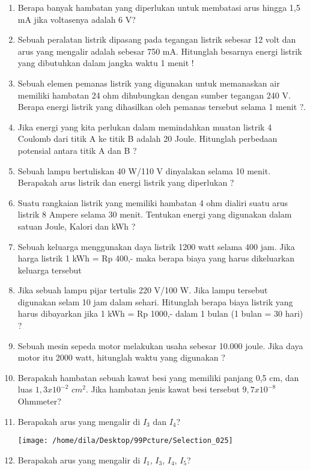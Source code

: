 \documentclass[12pt,a4paper,draft,final,oneside,twoside,openright,openany]{article}
\begin{document}
	\begin{enumerate}
	\item Berapa banyak hambatan yang diperlukan untuk membatasi arus hingga 1,5 mA jika voltasenya adalah 6 V?
	\item Sebuah peralatan listrik dipasang pada tegangan listrik sebesar 12 volt dan arus yang mengalir adalah sebesar 750 mA. Hitunglah besarnya energi listrik yang dibutuhkan dalam jangka waktu 1 menit !
	\item Sebuah elemen pemanas listrik yang digunakan untuk memanaskan air memiliki hambatan 24 ohm dihubungkan dengan sumber tegangan 240 V. Berapa energi listrik yang dihasilkan oleh pemanas tersebut selama 1 menit ?. 
	\item Jika energi yang kita perlukan dalam memindahkan muatan listrik 4 Coulomb dari titik A ke titik B adalah 20 Joule. Hitunglah perbedaan potensial antara titik A dan B ? 
	\item Sebuah lampu bertuliskan 40 W/110 V dinyalakan selama 10 menit. Berapakah arus listrik dan energi listrik yang diperlukan ?
	\item Suatu rangkaian listrik yang memiliki hambatan 4 ohm dialiri suatu arus listrik 8 Ampere selama 30 menit. Tentukan energi yang digunakan dalam satuan Joule, Kalori dan kWh ? 
	\item Sebuah keluarga menggunakan daya listrik 1200 watt selama 400 jam. Jika harga listrik 1 kWh = Rp 400,- maka berapa biaya yang harus dikeluarkan keluarga tersebut 
	\item Jika sebuah lampu pijar tertulis 220 V/100 W. Jika lampu tersebut digunakan selam 10 jam dalam sehari. Hitunglah berapa biaya listrik yang harus dibayarkan jika 1 kWh = Rp 1000,- dalam 1 bulan (1 bulan = 30 hari) ? 
	\item Sebuah mesin sepeda motor melakukan usaha sebesar 10.000 joule. Jika daya motor itu 2000 watt, hitunglah waktu yang digunakan ?
	\item Berapakah hambatan sebuah kawat besi yang memiliki panjang 0,5 cm, dan luas $1,3 x 10^{-2}$ $cm^2$. Jika hambatan jenis kawat besi tersebut $9,7 x 10^{-8}$ Ohmmeter? 
	\item Berapakah arus yang mengalir di $I_3$ dan $I_4$?
		\begin{center}
			\texttt{[image: /home/dila/Desktop/99Pcture/Selection\_025]}
		\end{center}
	\item Berapakah arus yang mengalir di $I_1$, $I_3$, $I_4$, $I_5$?
			\begin{center}

\end{center}
\end{enumerate}
\end{document}

